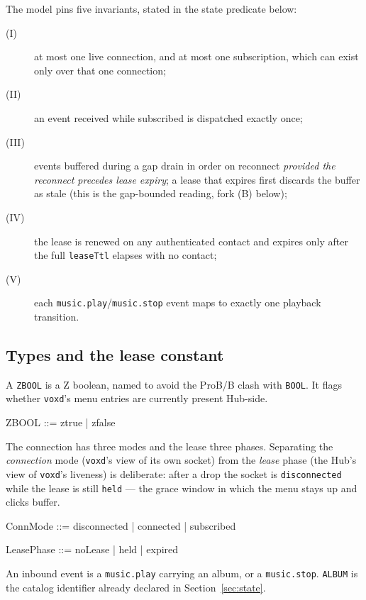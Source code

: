 \documentclass[a4paper,10pt,fleqn]{article}
\begin{document}
The model pins five invariants, stated in the state predicate below:

\begin{description}
  \item[(I)] at most one live connection, and at most one subscription, which
    can exist only over that one connection;
  \item[(II)] an event received while subscribed is dispatched exactly once;
  \item[(III)] events buffered during a gap drain in order on reconnect
    \emph{provided the reconnect precedes lease expiry}; a lease that expires
    first discards the buffer as stale (this is the gap-bounded reading, fork
    (B) below);
  \item[(IV)] the lease is renewed on any authenticated contact and expires only
    after the full \texttt{leaseTtl} elapses with no contact;
  \item[(V)] each \texttt{music.play}/\texttt{music.stop} event maps to exactly
    one playback transition.
\end{description}

\subsection{Types and the lease constant}

A \texttt{ZBOOL} is a Z boolean, named to avoid the ProB/B clash with
\texttt{BOOL}. It flags whether \texttt{voxd}'s menu entries are currently
present Hub-side.

\begin{zed}
  ZBOOL ::= ztrue | zfalse
\end{zed}

The connection has three modes and the lease three phases. Separating the
\emph{connection} mode (\texttt{voxd}'s view of its own socket) from the
\emph{lease} phase (the Hub's view of \texttt{voxd}'s liveness) is deliberate:
after a drop the socket is \texttt{disconnected} while the lease is still
\texttt{held} --- the grace window in which the menu stays up and clicks buffer.

\begin{zed}
  ConnMode ::= disconnected | connected | subscribed
\end{zed}

\begin{zed}
  LeasePhase ::= noLease | held | expired
\end{zed}

An inbound event is a \texttt{music.play} carrying an album, or a
\texttt{music.stop}. \texttt{ALBUM} is the catalog identifier already declared
in Section~\ref{sec:state}.
\end{document}
